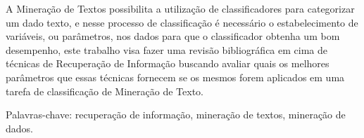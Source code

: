 A Mineração de Textos possibilita a utilização de classificadores para categorizar um dado texto, e nesse processo de classificação é necessário o estabelecimento de variáveis, ou parâmetros, nos dados para que o classificador obtenha um bom desempenho, este trabalho visa fazer uma revisão bibliográfica em cima de técnicas de Recuperação de Informação buscando avaliar quais os melhores parâmetros que essas técnicas fornecem se os mesmos forem aplicados em uma tarefa de classificação de Mineração de Texto. 


Palavras-chave: recuperação de informação, mineração de textos, mineração de dados.